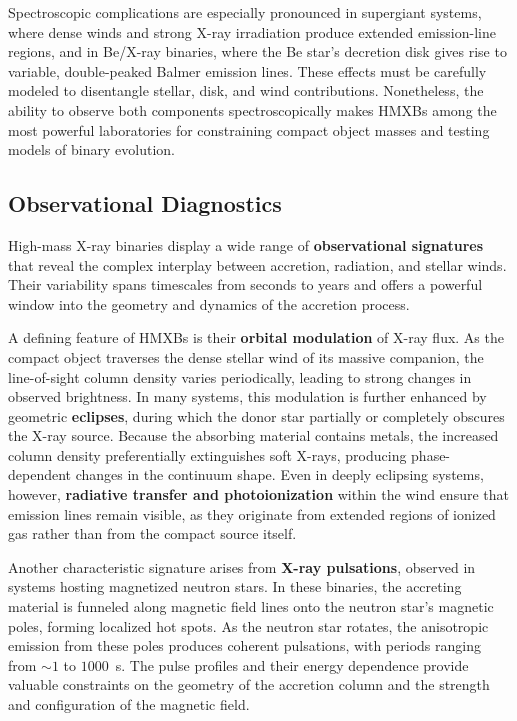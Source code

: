 \par
Spectroscopic complications are especially pronounced in supergiant systems, where dense winds and strong X-ray irradiation produce extended emission-line regions, and in Be/X-ray binaries, where the Be star’s decretion disk gives rise to variable, double-peaked Balmer emission lines. These effects must be carefully modeled to disentangle stellar, disk, and wind contributions. Nonetheless, the ability to observe both components spectroscopically makes HMXBs among the most powerful laboratories for constraining compact object masses and testing models of binary evolution.

\subsection{Observational Diagnostics}

High-mass X-ray binaries display a wide range of \textbf{observational signatures} that reveal the complex interplay between accretion, radiation, and stellar winds. Their variability spans timescales from seconds to years and offers a powerful window into the geometry and dynamics of the accretion process. 

\par
A defining feature of HMXBs is their \textbf{orbital modulation} of X-ray flux. As the compact object traverses the dense stellar wind of its massive companion, the line-of-sight column density varies periodically, leading to strong changes in observed brightness. In many systems, this modulation is further enhanced by geometric \textbf{eclipses}, during which the donor star partially or completely obscures the X-ray source. Because the absorbing material contains metals, the increased column density preferentially extinguishes soft X-rays, producing phase-dependent changes in the continuum shape. Even in deeply eclipsing systems, however, \textbf{radiative transfer and photoionization} within the wind ensure that emission lines remain visible, as they originate from extended regions of ionized gas rather than from the compact source itself.

\par
Another characteristic signature arises from \textbf{X-ray pulsations}, observed in systems hosting magnetized neutron stars. In these binaries, the accreting material is funneled along magnetic field lines onto the neutron star’s magnetic poles, forming localized hot spots. As the neutron star rotates, the anisotropic emission from these poles produces coherent pulsations, with periods ranging from $\sim 1$ to $1000$~s. The pulse profiles and their energy dependence provide valuable constraints on the geometry of the accretion column and the strength and configuration of the magnetic field.

